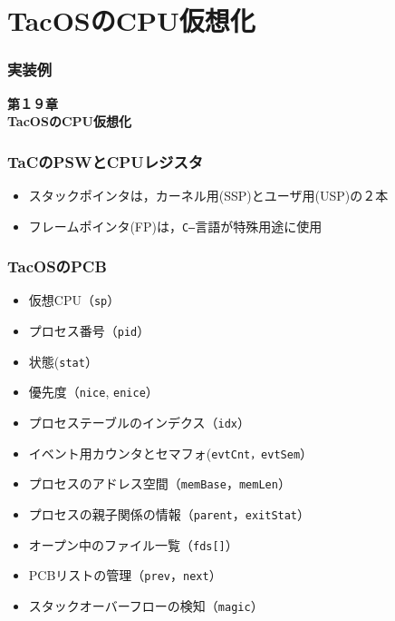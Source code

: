 \documentclass[unicode,handout]{beamer}                   %
\begin{document}
\section{TacOSのCPU仮想化}
\begin{frame}
  \frametitle{実装例}
  \vfill
  \begin{center}
    \textbf{\LARGE 第１９章} \\
    \textbf{\Huge TacOSのCPU仮想化}\\
    \vfill
  \end{center}
  \vfill
\end{frame}

\begin{frame}
  \frametitle{TaCのPSWとCPUレジスタ}
  \begin{itemize}
    \item スタックポインタは，カーネル用(SSP)とユーザ用(USP)の２本
    \item フレームポインタ(FP)は，\texttt{C--}言語が特殊用途に使用
  \end{itemize}
  \begin{center}
  \end{center}
  \vfill
\end{frame}

\begin{frame}
  \frametitle{TacOSのPCB}
  \begin{itemize}
    \item 仮想CPU（\texttt{sp}）
    \item プロセス番号（\texttt{pid}）
    \item 状態(\texttt{stat}）
    \item 優先度（\texttt{nice}, \texttt{enice}）
    \item プロセステーブルのインデクス（\texttt{idx}）
    \item イベント用カウンタとセマフォ(\texttt{evtCnt，evtSem}）
    \item プロセスのアドレス空間（\texttt{memBase}，\texttt{memLen}）
    \item プロセスの親子関係の情報（\texttt{parent}，\texttt{exitStat}）
    \item オープン中のファイル一覧（\texttt{fds[]}）
    \item PCBリストの管理（\texttt{prev}，\texttt{next}）
    \item スタックオーバーフローの検知（\texttt{magic}）
  \end{itemize}
  \vfill
\end{frame}
\end{document}
